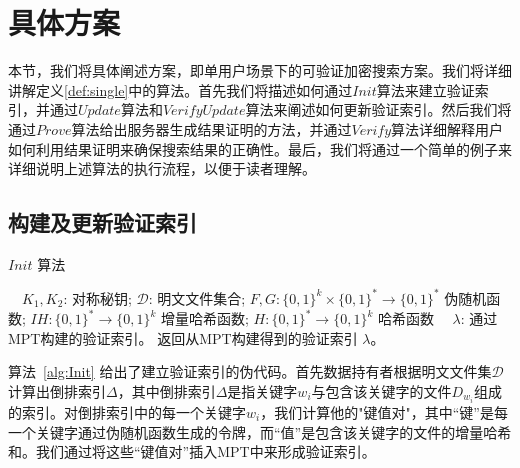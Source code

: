 \section{具体方案}
本节，我们将具体阐述\single 方案，即单用户场景下的可验证加密搜索方案。我们将详细讲解定义\ref{def:single}中的算法。首先我们将描述如何通过$Init$算法来建立验证索引，并通过$Update$算法和$VerifyUpdate$算法来阐述如何更新验证索引。然后我们将通过$Prove$算法给出服务器生成结果证明的方法，并通过$Verify$算法详细解释用户如何利用结果证明来确保搜索结果的正确性。最后，我们将通过一个简单的例子来详细说明上述算法的执行流程，以便于读者理解。

\subsection{构建及更新验证索引}
\begin{algorithm}[ht]
  \caption{$Init$ 算法}
  \label{alg:Init}
  \begin{algorithmic}[1]
    \REQUIRE ~~{$K_1,K_2$: 对称秘钥; $\mathcal{D}$: 明文文件集合;  $F, G: \{0, 1\}^k \times \{0, 1\}^* \rightarrow \{0, 1\}^*$ 伪随机函数; $IH: \{0, 1\}^* \rightarrow \{0, 1\}^k$ 增量哈希函数; $H: \{0, 1\}^* \rightarrow \{0, 1\}^k$ 哈希函数}
    \ENSURE ~~{$\lambda$: 通过MPT构建的验证索引。}
              \ENDFOR
              \RETURN 返回从MPT构建得到的验证索引 $\lambda$。
  \end{algorithmic}
\end{algorithm}

算法~\ref{alg:Init} 给出了建立验证索引的伪代码。首先数据持有者根据明文文件集$\mathcal{D}$计算出倒排索引$\Delta$，其中倒排索引$\Delta$是指关键字$w_i$与包含该关键字的文件$D_{w_i}$组成的索引。对倒排索引中的每一个关键字$w_i$，我们计算他的"键值对"，其中“键”是每一个关键字通过伪随机函数生成的令牌，而“值”是包含该关键字的文件的增量哈希和。我们通过将这些“键值对”插入MPT中来形成验证索引。

